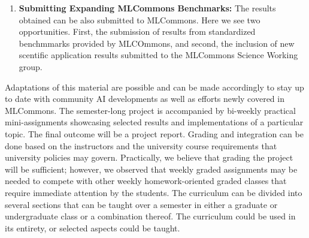 \documentclass[utf8]{FrontiersinVancouver} %
\begin{document}
\begin{enumerate}
\item{\bf Submitting Expanding MLCommons Benchmarks:} The results obtained can be also submitted to MLCommons. Here we see two opportunities. First, the submission of results from standardized benchmmarks provided by MLCOmmons, and second, the inclusion of new scentific application results submitted to the MLCommons Science Working group.
  
\end{enumerate}



Adaptations of this material are possible and can be made accordingly to stay up to date with community AI developments as well as efforts newly covered in MLCommons. The semester-long project is accompanied by bi-weekly practical mini-assignments showcasing selected results and implementations of a particular topic. The final outcome will be a project report. Grading and integration can be done based on the instructors and the university course requirements that university policies may govern. Practically, we believe that grading the project will be sufficient; however, we observed that weekly graded assignments may be needed to compete with other weekly homework-oriented graded classes that require immediate attention by the students.
The curriculum can be divided into several sections that can be taught over a semester in either a graduate or undergraduate class or a combination thereof. The curriculum could be used in its entirety, or selected aspects could be taught. 
\end{document}
